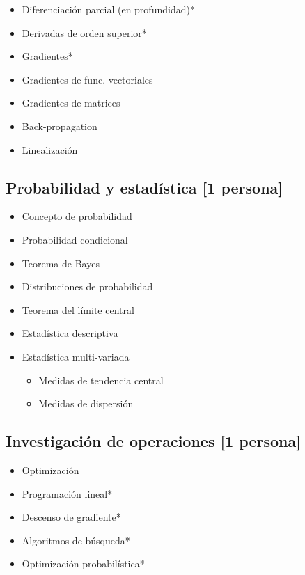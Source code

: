 \documentclass{article}
\begin{document}
            \begin{itemize}
                \item Diferenciación parcial (en profundidad)*
                \item Derivadas de orden superior*
                \item Gradientes*
                \item Gradientes de func. vectoriales
                \item Gradientes de matrices
                \item Back-propagation
                \item Linealización
            \end{itemize}

        \subsection{Probabilidad y estadística [1 persona]}
            \begin{itemize}
                \item Concepto de probabilidad
                \item Probabilidad condicional
                \item Teorema de Bayes
                \item Distribuciones de probabilidad
                \item Teorema del límite central
                \item Estadística descriptiva
                \item Estadística multi-variada
                \begin{itemize}
                    \item Medidas de tendencia central
                    \item Medidas de dispersión
                \end{itemize}
            \end{itemize}
        
        \subsection{Investigación de operaciones [1 persona]}
            
            \begin{itemize}
                \item Optimización
                \item Programación lineal*
                \item Descenso de gradiente*
                \item Algoritmos de búsqueda*
                \item Optimización probabilística*
            \end{itemize}
        
\end{document}
